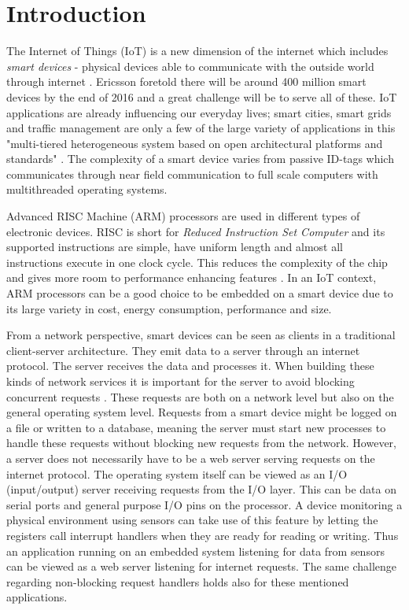 \chapter{Introduction}
\label{cha:introduction}

The Internet of Things (IoT) is a new dimension of the internet which includes
\textit{smart devices} - physical devices able to communicate with the outside
world through internet
\cite{design-principles-for-distributed-embedded-applications}. Ericsson
foretold there will be around 400 million smart devices by the end of 2016
\cite{ericsson-iot-forecast} and a great challenge will be to serve all of
these. IoT applications are already influencing our everyday lives; smart
cities, smart grids and traffic management are only a few of the large variety
of applications in this "multi-tiered heterogeneous system based on open
architectural platforms and standards" \cite{gardavsevic2017iot}. The
complexity of a smart device varies from passive ID-tags which communicates
through near field communication to full scale computers with multithreaded
operating systems.

Advanced RISC Machine (ARM) processors are used in different types of
electronic devices. RISC is short for \textit{Reduced Instruction Set Computer}
and its supported instructions are simple, have uniform length and almost all
instructions execute in one clock cycle. This reduces the complexity of the
chip and gives more room to performance enhancing features \cite{risc-vs-cisc}.
In an IoT context, ARM processors can be a good choice to be embedded on a
smart device due to its large variety in cost, energy consumption, performance
and size.

From a network perspective, smart devices can be seen as clients in a
traditional client-server architecture. They emit data to a server through an
internet protocol. The server receives the data and processes it. When building
these kinds of network services it is important for the server to avoid
blocking concurrent requests \cite{elmeleegy2004lazy}. These requests are both
on a network level but also on the general operating system level. Requests
from a smart device might be logged on a file or written to a database, meaning
the server must start new processes to handle these requests without blocking
new requests from the network. However, a server does not necessarily have to
be a web server serving requests on the internet protocol. The operating system
itself can be viewed as an I/O (input/output) server receiving requests from
the I/O layer. This can be data on serial ports and general purpose I/O pins on
the processor. A device monitoring a physical environment using sensors can
take use of this feature by letting the registers call interrupt handlers when
they are ready for reading or writing. Thus an application running on an
embedded system listening for data from sensors can be viewed as a web server
listening for internet requests. The same challenge regarding non-blocking
request handlers holds also for these mentioned applications.

